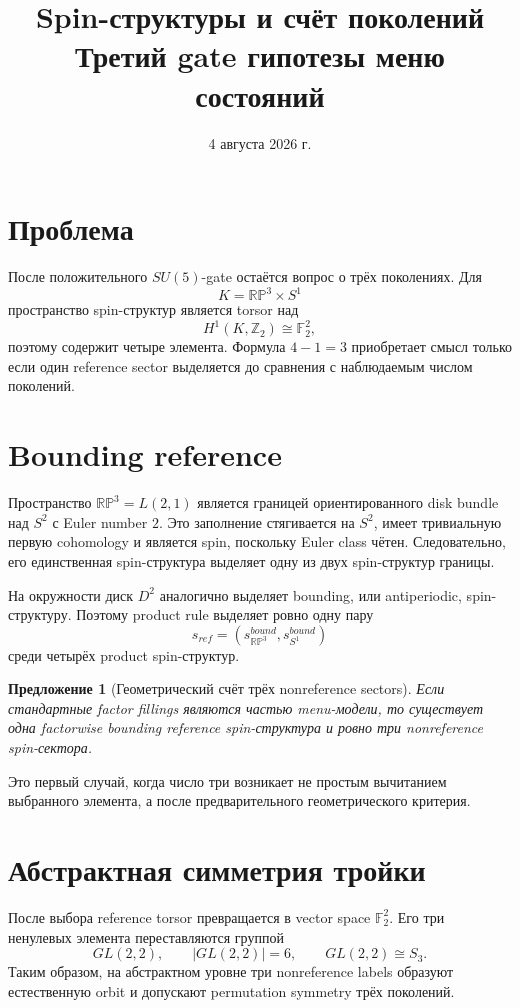 \documentclass[12pt,a4paper]{article}
\title{Spin-структуры и счёт поколений\\
Третий gate гипотезы меню состояний}
\author{}
\date{4 августа 2026 г.}
\newtheorem{proposition}{Предложение}
\begin{document}
\maketitle

\section{Проблема}

После положительного \(SU(5)\)-gate остаётся вопрос о трёх поколениях. Для
\[
K=\mathbb{RP}^3\times S^1
\]
пространство spin-структур является torsor над
\[
H^1(K,\mathbb Z_2)\cong\mathbb F_2^2,
\]
поэтому содержит четыре элемента. Формула \(4-1=3\) приобретает смысл только если один reference sector выделяется до сравнения с наблюдаемым числом поколений.

\section{Bounding reference}

Пространство \(\mathbb{RP}^3=L(2,1)\) является границей ориентированного disk bundle над \(S^2\) с Euler number \(2\). Это заполнение стягивается на \(S^2\), имеет тривиальную первую cohomology и является spin, поскольку Euler class чётен. Следовательно, его единственная spin-структура выделяет одну из двух spin-структур границы.

На окружности диск \(D^2\) аналогично выделяет bounding, или antiperiodic, spin-структуру. Поэтому product rule выделяет ровно одну пару
\[
s_{ref}=(s_{\mathbb{RP}^3}^{bound},s_{S^1}^{bound})
\]
среди четырёх product spin-структур.

\begin{proposition}[Геометрический счёт трёх nonreference sectors]
Если стандартные factor fillings являются частью menu-модели, то существует одна factorwise bounding reference spin-структура и ровно три nonreference spin-сектора.
\end{proposition}

Это первый случай, когда число три возникает не простым вычитанием выбранного элемента, а после предварительного геометрического критерия.

\section{Абстрактная симметрия тройки}

После выбора reference torsor превращается в vector space \(\mathbb F_2^2\). Его три ненулевых элемента переставляются группой
\[
GL(2,2),
\qquad
|GL(2,2)|=6,
\qquad
GL(2,2)\cong S_3.
\]
Таким образом, на абстрактном уровне три nonreference labels образуют естественную orbit и допускают permutation symmetry трёх поколений.
\end{document}

